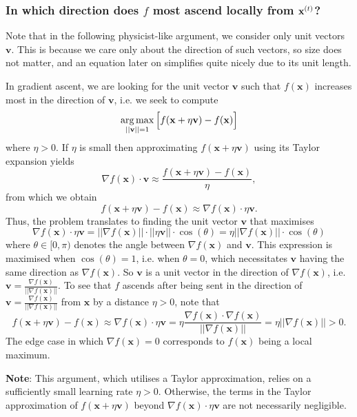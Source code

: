 \documentclass[11pt]{article}
\begin{document}
\subsubsection{In which direction does $f$ most ascend locally from $\mathbf{x}^{(t)}$?}
Note that in the following physicist-like argument, we consider only unit vectors $\mathbf{v}$. This is because we care only about the direction of such vectors, so size does not matter, and an equation later on simplifies quite nicely due to its unit length. 

In gradient ascent, we are looking for the unit vector $\mathbf{v}$ such that $f(\mathbf{x})$ increases most in the direction of $\mathbf{v}$, i.e. we seek to compute
$$\operatorname*{arg\,max}_{||\mathbf{v}||=1}\Big[f(\mathbf{x}+\eta\mathbf{v})-f(\mathbf{x})\Big]$$
where $\eta>0$. If $\eta$ is small then approximating $f(\mathbf{x}+\eta\mathbf{v})$ using its Taylor expansion yields
$$
\nabla f(\mathbf{x})\cdot\mathbf{v}\approx\frac{f(\mathbf{x}+\eta\mathbf{v})-f(\mathbf{x})}{\eta},
$$
from which we obtain
$$
f(\mathbf{x}+\eta\mathbf{v})-f(\mathbf{x})
\approx
\nabla f(\mathbf{x})\cdot\eta\mathbf{v}.
$$
Thus, the problem translates to finding the unit vector $\mathbf{v}$ that maximises
$$
\nabla f(\mathbf{x})\cdot\eta\mathbf{v}=||\nabla f(\mathbf{x})||\cdot||\eta\mathbf{v}||\cdot\cos(\theta)=\eta||\nabla f(\mathbf{x})||\cdot\cos(\theta)
$$
where $\theta\in[0,\pi)$ denotes the angle between $\nabla f(\mathbf{x})$ and $\mathbf{v}$. This expression is maximised when $\cos(\theta)=1$, i.e. when $\theta=0$, which necessitates $\mathbf{v}$ having the same direction as $\nabla f(\mathbf{x})$. So $\mathbf{v}$ is a unit vector in the direction of $\nabla f(\mathbf{x})$, i.e. $\mathbf{v}=\frac{\nabla f(\mathbf{x})}{||\nabla f(\mathbf{x})||}$. To see that $f$ ascends after being sent in the direction of $\mathbf{v}=\frac{\nabla f(\mathbf{x})}{||\nabla f(\mathbf{x})||}$ from $\mathbf{x}$ by a distance $\eta>0$, note that
$$
f(\mathbf{x}+\eta\mathbf{v})-f(\mathbf{x})
\approx
\nabla f(\mathbf{x})\cdot\eta\mathbf{v}
=
\eta\frac{\nabla f(\mathbf{x})\cdot\nabla f(\mathbf{x})}{||\nabla f(\mathbf{x})||}
=
\eta||\nabla f(\mathbf{x})||
>
0.
$$
The edge case in which $\nabla f(\mathbf{x})=0$ corresponds to $f(\mathbf{x})$ being a local maximum.

\vspace{10pt}
\noindent\textbf{Note}: This argument, which utilises a Taylor approximation, relies on a sufficiently small learning rate $\eta>0$. Otherwise, the terms in the Taylor approximation of $f(\mathbf{x}+\eta\mathbf{v})$ beyond $\nabla f(\mathbf{x})\cdot\eta\mathbf{v}$ are not necessarily negligible.
\end{document}
